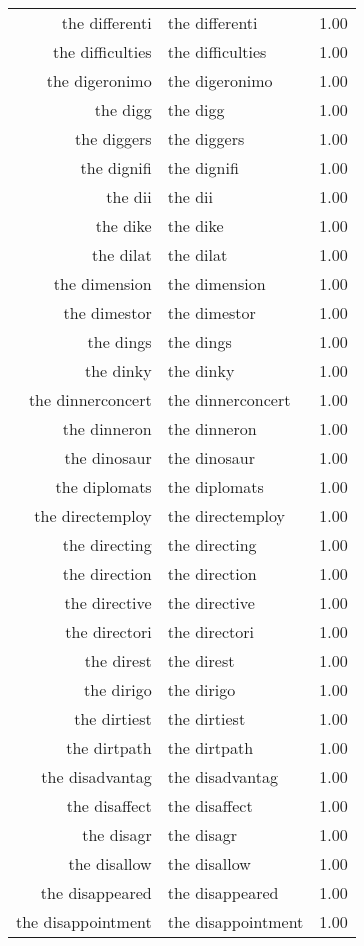 \begin{table}[ht]
\begin{tabular}{rlr}
  the differenti & the differenti & 1.00 \\ 
  the difficulties & the difficulties & 1.00 \\ 
  the digeronimo & the digeronimo & 1.00 \\ 
  the digg & the digg & 1.00 \\ 
  the diggers & the diggers & 1.00 \\ 
  the dignifi & the dignifi & 1.00 \\ 
  the dii & the dii & 1.00 \\ 
  the dike & the dike & 1.00 \\ 
  the dilat & the dilat & 1.00 \\ 
  the dimension & the dimension & 1.00 \\ 
  the dimestor & the dimestor & 1.00 \\ 
  the dings & the dings & 1.00 \\ 
  the dinky & the dinky & 1.00 \\ 
  the dinnerconcert & the dinnerconcert & 1.00 \\ 
  the dinneron & the dinneron & 1.00 \\ 
  the dinosaur & the dinosaur & 1.00 \\ 
  the diplomats & the diplomats & 1.00 \\ 
  the directemploy & the directemploy & 1.00 \\ 
  the directing & the directing & 1.00 \\ 
  the direction & the direction & 1.00 \\ 
  the directive & the directive & 1.00 \\ 
  the directori & the directori & 1.00 \\ 
  the direst & the direst & 1.00 \\ 
  the dirigo & the dirigo & 1.00 \\ 
  the dirtiest & the dirtiest & 1.00 \\ 
  the dirtpath & the dirtpath & 1.00 \\ 
  the disadvantag & the disadvantag & 1.00 \\ 
  the disaffect & the disaffect & 1.00 \\ 
  the disagr & the disagr & 1.00 \\ 
  the disallow & the disallow & 1.00 \\ 
  the disappeared & the disappeared & 1.00 \\ 
  the disappointment & the disappointment & 1.00 \\ 

\end{tabular}
\end{table}

